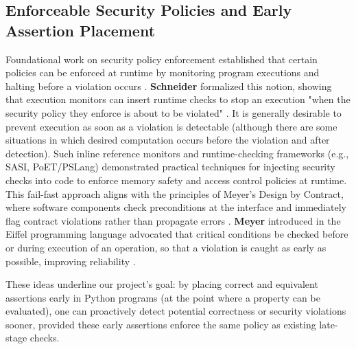 \documentclass[8pt]{extarticle}
\begin{document}
\subsection{Enforceable Security Policies and Early Assertion Placement}
Foundational work on security policy enforcement established that certain policies can be enforced at runtime by monitoring program executions and halting before a violation occurs \cite{schneider2000}. \textbf{Schneider} formalized this notion, showing that execution monitors can insert runtime checks to stop an execution "when the security policy they enforce is about to be violated" \cite{schneider2000}. It is generally desirable to prevent execution as soon as a violation is detectable (although there are some situations in which desired computation occurs before the violation and after detection). Such inline reference monitors and runtime-checking frameworks (e.g., SASI, PoET/PSLang) demonstrated practical techniques for injecting security checks into code to enforce memory safety and access control policies at runtime. This fail-fast approach aligns with the principles of Meyer's Design by Contract, where software components check preconditions at the interface and immediately flag contract violations rather than propagate errors \cite{meyer1992}. \textbf{Meyer} introduced in the Eiffel programming language advocated that critical conditions be checked before or during execution of an operation, so that a violation is caught as early as possible, improving reliability \cite{meyer1992}.

These ideas underline our project's goal: by placing correct and equivalent assertions early in Python programs (at the point where a property can be evaluated), one can proactively detect potential correctness or security violations sooner, provided these early assertions enforce the same policy as existing late-stage checks.

\end{document}

